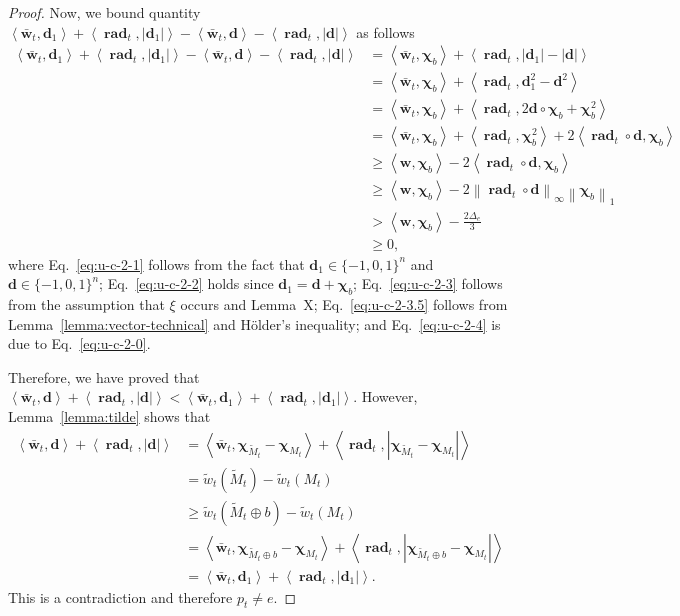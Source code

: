 \documentclass{article}
\DeclareMathOperator{\rad}{rad}
\newcommand{\inn}[1]{\left\langle #1 \right\rangle}
\newcommand{\nor}[1]{\left\|#1\right\|}
\renewcommand{\vec}[1]{\boldsymbol{#1}}
\renewcommand{\odot}{\circ}
\begin{document}
\begin{spacing}{1.1}
\begin{proof}
Now, we bound quantity $\inn{\vec {\bar w}_t, \vec d_1}+\inn{\vec \rad_t, |\vec d_1|}
-\inn{\vec {\bar w}_t, \vec d}-\inn{\vec \rad_t,  |\vec d|}$ as follows
\begin{align}
\inn{\vec {\bar w}_t, \vec d_1}+\inn{\vec \rad_t, |\vec d_1|}
-\inn{\vec {\bar w}_t, \vec d}-\inn{\vec \rad_t,  |\vec d|}
& = \inn{\vec {\bar w}_t, \vec \chi_b} + \inn{\vec \rad_t, |\vec d_1|-|\vec d|} \nonumber\\
& =	\inn{\vec {\bar w}_t, \vec \chi_b} + \inn{\vec \rad_t, \vec d_1^2-\vec d^2} \label{eq:u-c-2-1} \\
& =	\inn{\vec {\bar w}_t, \vec \chi_b} + \inn{\vec \rad_t, 2\vec d\odot \vec \chi_b +\vec \chi_b^2} \label{eq:u-c-2-2} \\
& =	\inn{\vec {\bar w}_t, \vec \chi_b} + \inn{\vec \rad_t, \vec\chi_b^2} + 2\inn{\vec \rad_t\odot \vec d, \vec \chi_b} \nonumber \\
& \ge \inn{\vec w, \vec \chi_b}- 2\inn{\vec \rad_t\odot \vec d, \vec \chi_b}  \label{eq:u-c-2-3} \\
& \ge \inn{\vec w, \vec \chi_b}-2\nor{\vec \rad_t\odot \vec d}_\infty\nor{\vec\chi_b}_1 \label{eq:u-c-2-3.5} \\
& > \inn{\vec w, \vec \chi_b}-\frac{2\Delta_e}{3} \label{eq:u-c-2-4} \\
& \ge 0 \label{eq:u-c-2-5},
\end{align}
where Eq.~\eqref{eq:u-c-2-1} follows from the fact that $\vec d_1\in \{-1,0,1\}^n$ and $\vec d \in \{-1,0,1\}^n$;
Eq.~\eqref{eq:u-c-2-2} holds since $\vec d_1=\vec d+\vec \chi_b$;
Eq.~\eqref{eq:u-c-2-3} follows from the assumption that $\xi$ occurs and Lemma~X;
Eq.~\eqref{eq:u-c-2-3.5} follows from Lemma~\ref{lemma:vector-technical}  and H\"older's inequality;
and Eq.~\eqref{eq:u-c-2-4} is due to Eq.~\eqref{eq:u-c-2-0}.

Therefore, we have proved that $\inn{\vec {\bar w}_t, \vec d}+\inn{\vec \rad_t,  |\vec d|} < \inn{\vec {\bar w}_t, \vec d_1}+\inn{\vec \rad_t, |\vec d_1|}.
$
However, Lemma~\ref{lemma:tilde} shows that 
\begin{align*}
\inn{\vec {\bar w}_t, \vec d}+\inn{\vec \rad_t,  |\vec d|} 
&= \inn{\vec {\bar w}_t, \vec \chi_{\tilde M_t} - \vec \chi_{M_t}}+\inn{\vec \rad_t,  |\vec \chi_{\tilde M_t} - \vec \chi_{M_t}|} \\
&= \tilde w_t(\tilde M_t) - \tilde w_t(M_t)\\
& \ge \tilde w_t(\tilde M_t \oplus b)-\tilde w_t(M_t)\\
&= \inn{\vec {\bar w}_t, \vec \chi_{\tilde M_t \oplus b} - \vec \chi_{M_t}}+\inn{\vec \rad_t,  |\vec \chi_{\tilde M_t \oplus b} - \vec \chi_{M_t}|} \\
&= \inn{\vec {\bar w}_t, \vec d_1}+\inn{\vec \rad_t,  |\vec d_1|}. 
\end{align*}
This is a contradiction and therefore $p_t\not= e$.


\end{proof}
\end{spacing}
\end{document}
